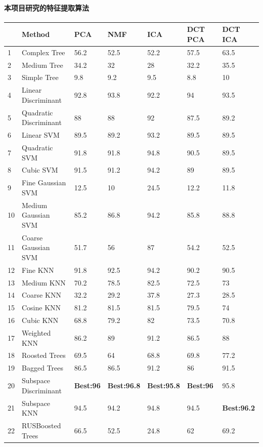 \paragraph{本项目研究的特征提取算法}
\begin{center}
\label{table: classifiers}
\begin{tabular}{|l|l|l|l|l|l|l|}
\hline
&Method&PCA&NMF&ICA& DCT PCA & DCT ICA\\\hline
1&Complex Tree &56.2&52.5&52.2&57.5&63.5\\\hline
2&Medium Tree & 34.2&32&28&32.2&35.5\\\hline
3&Simple Tree & 9.8&9.2&9.5&8.8&10\\\hline
4&Linear Discriminant & 92.8&93.8&92.2&94&93.5\\\hline
5&Quadratic Discriminant & 88&88&92&87.5&89.2\\\hline
6&Linear SVM& 89.5&89.2&93.2&89.5&89.5\\\hline
7&Quadratic SVM&91.8&91.8&94.8&90.5&89.5\\\hline
8&Cubic SVM& 91.5&91.2&94.2&89&89.5\\\hline
9&Fine Gaussian SVM&12.5&10&24.5&12.2&11.8\\\hline
10&Medium Gaussian SVM&85.2&86.8&94.2&85.8&88.8\\\hline
11&Coarse Gaussian SVM&51.7&56&87&54.2&52.5\\\hline
12&Fine KNN&91.8&92.5&94.2&90.2&90.5\\\hline
13&Medium KNN&70.2&78.5&82.5&72.5&73\\\hline
14&Coarse KNN&32.2&29.2&37.8&27.3&28.5\\\hline
15&Cosine KNN&81.2&81.5&81.5&79.5&74\\\hline
16&Cubic KNN&68.8&79.2&82&73.5&70.8\\\hline
17&Weighted KNN&86.2&89&91.2&86.5&88\\\hline
18&Roosted Trees&69.5&64&68.8&69.8&77.2\\\hline
19&Bagged Trees&86.5&86.5&91.2&86&91.5\\\hline
20&Subspace Discriminant&\textbf{Best:96}&\textbf{Best:96.8}&\textbf{Best:95.8}&\textbf{Best:96}&95.8\\\hline
21&Subspace KNN&94.5&94.2&94.8&94.5&\textbf{Best:96.2}\\\hline
22&RUSBoosted Trees&66.5&52.5&24.8&62&69.2\\\hline
\end{tabular}
\end{center}

